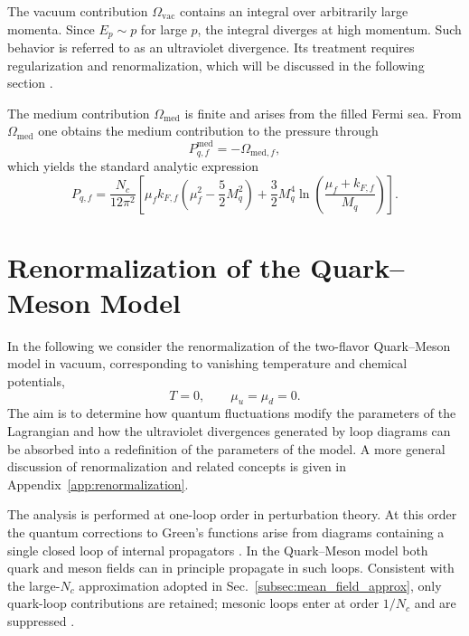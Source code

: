 The vacuum contribution $\Omega_{\text{vac}}$ contains an integral
over arbitrarily large momenta.
Since $E_p \sim p$ for large $p$, the integral diverges at high
momentum.
Such behavior is referred to as an ultraviolet divergence.
Its treatment requires regularization and renormalization, which
will be discussed in the following section \cite{PeskinSchroeder1995,Weinberg1995}.

The medium contribution $\Omega_{\text{med}}$ is finite and arises
from the filled Fermi sea.
From $\Omega_{\text{med}}$ one obtains the medium contribution to
the pressure through
\begin{equation}
P_{q,f}^{\mathrm{med}}
=
- \Omega_{\text{med},f},
\end{equation}
which yields the standard analytic expression
\cite{KapustaGale,Buballa2005}
\begin{equation}
P_{q,f} =
\frac{N_c}{12\pi^2}
\left[
\mu_f k_{F,f}
\left(\mu_f^2 - \frac{5}{2}M_q^2\right)
+ \frac{3}{2} M_q^4
\ln\!\left(
\frac{\mu_f + k_{F,f}}{M_q}
\right)
\right].
\end{equation}

\section{Renormalization of the Quark--Meson Model}
\label{sec:qm_renormalization}

In the following we consider the renormalization of the two-flavor
Quark--Meson model in vacuum, corresponding to vanishing
temperature and chemical potentials,
\begin{equation}
T = 0, \qquad \mu_u = \mu_d = 0 .
\end{equation}
The aim is to determine how quantum fluctuations modify the parameters
of the Lagrangian and how the ultraviolet divergences
generated by loop diagrams can be absorbed into a redefinition of the
parameters of the model. A more general discussion of renormalization
and related concepts is given in Appendix~\ref{app:renormalization}.

The analysis is performed at one-loop order in perturbation theory.
At this order the quantum corrections to Green's functions arise from
diagrams containing a single closed loop of internal propagators
\cite{PeskinSchroeder1995,WeinbergQFT}. In the Quark--Meson model both
quark and meson fields can in principle propagate in such loops.
Consistent with the large-$N_c$ approximation adopted in
Sec.~\ref{subsec:mean_field_approx}, only quark-loop contributions are retained;
mesonic loops enter at order $1/N_c$ and are suppressed \cite{SchaeferWambach2008,Folkestad2018,Andersen2024}.

